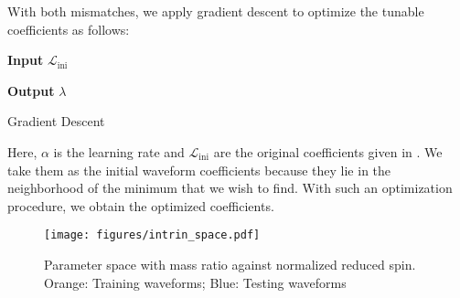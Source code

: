 \documentclass[twocolumn]{aastex631}
\begin{document}
With both mismatches, we apply gradient descent to optimize the tunable coefficients as follows: 
\begin{algorithm}[H]
	\hspace*{\algorithmicindent} \textbf{Input} $\mathcal{L}_{\mathrm{ini}}$
	\begin{algorithmic}[1]
		\EndWhile
	\end{algorithmic}
	\hspace*{\algorithmicindent} \textbf{Output} $\lambda$
	\caption{Gradient Descent}
\end{algorithm}
Here, $\alpha$ is the learning rate and $\mathcal{L}_{\mathrm{ini}}$ are the original coefficients given in \citep{khan2016frequency}. We take them as the initial waveform coefficients because they lie in the neighborhood of the minimum that we wish to find. With such an optimization procedure, we obtain the optimized coefficients. 

\begin{figure}[t]
	\centering
	\texttt{[image: figures/intrin\_space.pdf]}
	\caption{Parameter space with mass ratio against normalized reduced spin. Orange: Training waveforms; Blue: Testing waveforms}
	\label{fig:intrin_space}
\end{figure}
\end{document}
